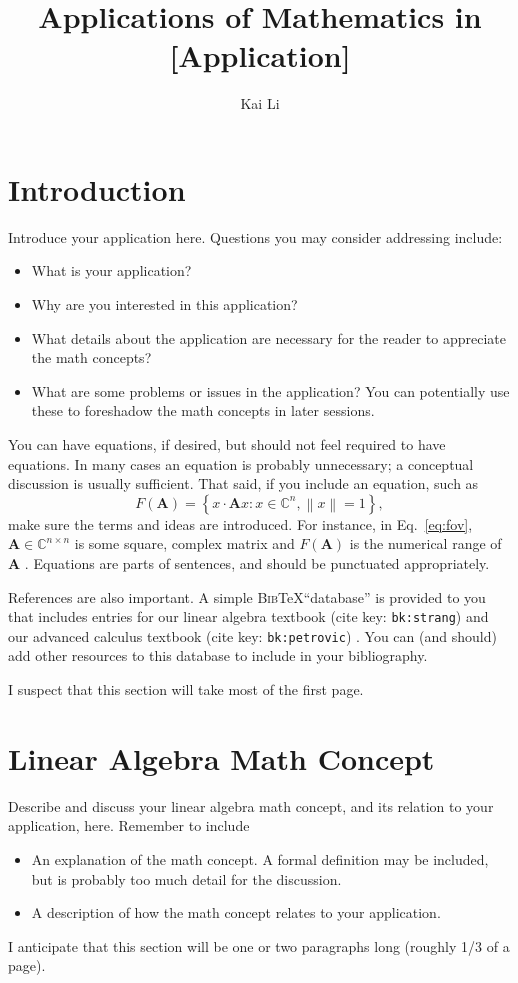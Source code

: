 \documentclass[final]{siamart1116}
\title{Applications of Mathematics in [Application]}
\author{Kai Li}
\begin{document}
\maketitle

\section{Introduction}
\label{sec:intro}
Introduce your application here. Questions you may consider addressing include:
\begin{itemize}
\item What is your application?
\item Why are you interested in this application?
\item What details about the application are necessary for the reader to appreciate the math concepts?
\item What are some problems or issues in the application? You can potentially use these to foreshadow the math concepts in later sessions.
\end{itemize}

You can have equations, if desired, but should not feel required to have equations. In many cases an equation is probably unnecessary; a conceptual discussion is usually sufficient. That said, if you include an equation, such as
\begin{equation}
F(\mathbf{A}) = \left\{ x \cdot \mathbf{A}x : x\in\mathbb{C}^n, \left\| x \right\|=1 \right\},
\label{eq:fov}
\end{equation}
make sure the terms and ideas are introduced. For instance, in Eq.\ \eqref{eq:fov}, $\mathbf{A}\in\mathbb{C}^{n\times n}$ is some square, complex matrix and $F(\mathbf{A})$ is the numerical range of $\mathbf{A}$ \cite{bk:horn}. Equations are parts of sentences, and should be punctuated appropriately.

References are also important. A simple \textsc{Bib}\TeX ``database'' is provided to you that includes entries for our linear algebra textbook (cite key: \texttt{bk:strang}) \cite{bk:strang} and our advanced calculus textbook (cite key: \texttt{bk:petrovic}) \cite{bk:petrovic}. You can (and should) add other resources to this database to include in your bibliography.

I suspect that this section will take most of the first page.

\section{Linear Algebra Math Concept}
\label{sec:la}
Describe and discuss your linear algebra math concept, and its relation to your application, here. Remember to include
\begin{itemize}
\item An explanation of the math concept. A formal definition may be included, but is probably too much detail for the discussion.
\item A description of how the math concept relates to your application.
\end{itemize}
I anticipate that this section will be one or two paragraphs long (roughly 1/3 of a page).
\end{document}
